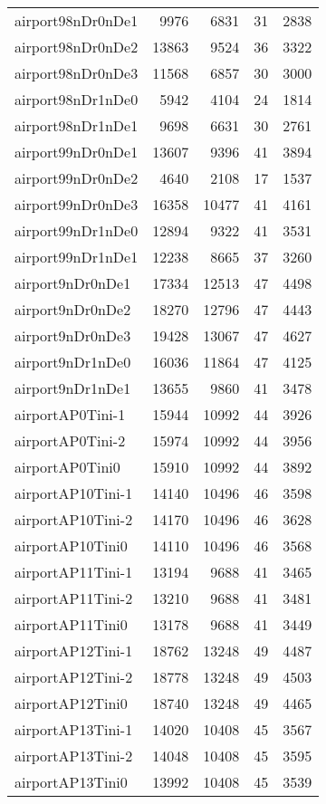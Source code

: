 \begin{longtable}{lrrrr}
airport98nDr0nDe1 & 9976 & 6831 & 31 & 2838 \\
airport98nDr0nDe2 & 13863 & 9524 & 36 & 3322 \\
airport98nDr0nDe3 & 11568 & 6857 & 30 & 3000 \\
airport98nDr1nDe0 & 5942 & 4104 & 24 & 1814 \\
airport98nDr1nDe1 & 9698 & 6631 & 30 & 2761 \\
airport99nDr0nDe1 & 13607 & 9396 & 41 & 3894 \\
airport99nDr0nDe2 & 4640 & 2108 & 17 & 1537 \\
airport99nDr0nDe3 & 16358 & 10477 & 41 & 4161 \\
airport99nDr1nDe0 & 12894 & 9322 & 41 & 3531 \\
airport99nDr1nDe1 & 12238 & 8665 & 37 & 3260 \\
airport9nDr0nDe1 & 17334 & 12513 & 47 & 4498 \\
airport9nDr0nDe2 & 18270 & 12796 & 47 & 4443 \\
airport9nDr0nDe3 & 19428 & 13067 & 47 & 4627 \\
airport9nDr1nDe0 & 16036 & 11864 & 47 & 4125 \\
airport9nDr1nDe1 & 13655 & 9860 & 41 & 3478 \\
airportAP0Tini-1 & 15944 & 10992 & 44 & 3926 \\
airportAP0Tini-2 & 15974 & 10992 & 44 & 3956 \\
airportAP0Tini0 & 15910 & 10992 & 44 & 3892 \\
airportAP10Tini-1 & 14140 & 10496 & 46 & 3598 \\
airportAP10Tini-2 & 14170 & 10496 & 46 & 3628 \\
airportAP10Tini0 & 14110 & 10496 & 46 & 3568 \\
airportAP11Tini-1 & 13194 & 9688 & 41 & 3465 \\
airportAP11Tini-2 & 13210 & 9688 & 41 & 3481 \\
airportAP11Tini0 & 13178 & 9688 & 41 & 3449 \\
airportAP12Tini-1 & 18762 & 13248 & 49 & 4487 \\
airportAP12Tini-2 & 18778 & 13248 & 49 & 4503 \\
airportAP12Tini0 & 18740 & 13248 & 49 & 4465 \\
airportAP13Tini-1 & 14020 & 10408 & 45 & 3567 \\
airportAP13Tini-2 & 14048 & 10408 & 45 & 3595 \\
airportAP13Tini0 & 13992 & 10408 & 45 & 3539 \\

\end{longtable}
